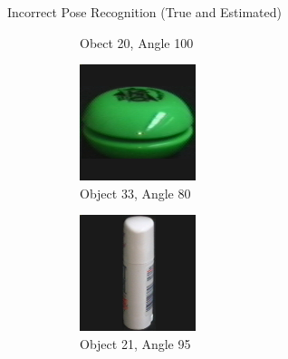 \documentclass[aspectratio=169, handout, 10pt, hyperref=colorlinks]{beamer}
\begin{document}
\begin{frame}{Incorrect Pose Recognition (True and Estimated)}
\begin{figure}
\begin{subfigure}{0.32\linewidth}
            \vspace{1em}
            \caption{Obect 20, Angle 100}
        \end{subfigure}
        \begin{subfigure}{0.32\linewidth}
            \centering
            \includegraphics[width = 0.6\linewidth]{incorrect/obj34__80.png}
            \vspace{1em}
            \caption{Object 33, Angle 80}
        \end{subfigure}
        \begin{subfigure}{0.32\linewidth}
            \centering
            \includegraphics[width = 0.6\linewidth]{incorrect/obj22__95.png}
            \vspace{1em}
            \caption{Object 21, Angle 95}
        \end{subfigure}
        \begin{subfigure}{0.32\linewidth}
            \centering

\end{subfigure}
\end{figure}
\end{frame}
\end{document}
